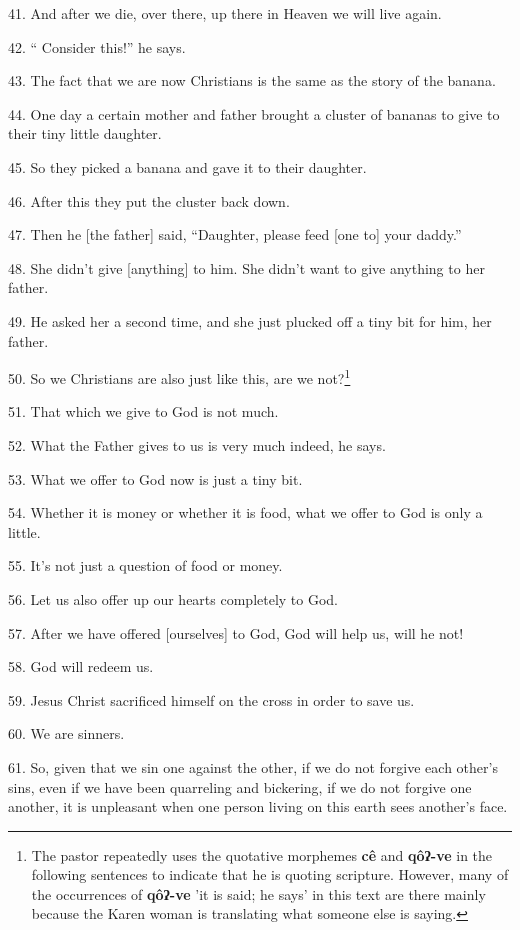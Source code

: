 41. And after we die, over there, up there in Heaven we will live again.

42. `` Consider this!'' he says.

43. The fact that we are now Christians is the same as the story of the banana.

44. One day a certain mother and father brought a cluster of bananas to give to
their tiny little daughter.

45. So they picked a banana and gave it to their daughter.

46. After this they put the cluster back down.

47. Then he [the father] said, ``Daughter, please feed [one to] your daddy.''

48. She didn't give [anything] to him. She didn't want to give anything to her
father.

49. He asked her a second time, and she just plucked off a tiny bit for him, her
father.

50. So we Christians are also just like this, are we not?\footnote{The pastor repeatedly uses the quotative morphemes \textbf{cê} and \textbf{qôʔ-ve} in the following sentences to indicate that he is quoting scripture. However, many of the occurrences of \textbf{qôʔ-ve} 'it is said; he says' in this text are there mainly because the Karen woman is translating what someone else is saying.}

51. That which we give to God is not much.

52. What the Father gives to us is very much indeed, he says.

53. What we offer to God now is just a tiny bit.

54. Whether it is money or whether it is food, what we offer to God is only a little.

55. It's not just a question of food or money.

56. Let us also offer up our hearts completely to God.

57. After we have offered [ourselves] to God, God will help us, will he not!

58. God will redeem us.

59. Jesus Christ sacrificed himself on the cross in order to save us.

60. We are sinners.

61. So, given that we sin one against the other, if we do not forgive each other's
sins, even if we have been quarreling and bickering, if we do not forgive one another,
it is unpleasant when one person living on this earth sees another's face.

